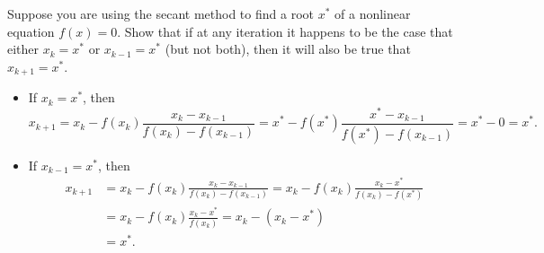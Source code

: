 \begin{pro}
  Suppose you are using the secant method to find a root $x^{*}$ of a
  nonlinear equation $f(x)=0$.
  Show that if at any iteration it happens to be the case that either
  $x_k=x^{*}$ or $x_{k-1}=x^{*}$
  (but not both),
  then it will also be true that $x_{k+1}=x^{*}$.
\end{pro}
\begin{sol}
  \begin{itemize}
  \item
    If $x_k=x^{*}$, then
    \begin{displaymath}
      x_{k+1} = x_k - f(x_k)\frac{x_k-x_{k-1}}{f(x_k)-f(x_{k-1})}
      = x^{*} - f(x^{*})\frac{x^{*}-x_{k-1}}{f(x^{*})-f(x_{k-1})}
      = x^{*} - 0 = x^{*}.
    \end{displaymath}

  \item
    If $x_{k-1}=x^{*}$, then
    \begin{align*}
      x_{k+1} &= x_k - f(x_k)\frac{x_k-x_{k-1}}{f(x_k)-f(x_{k-1})}
                = x_k - f(x_k)\frac{x_k - x^{*}}{f(x_k)-f(x^{*})} \\
      &= x_k - f(x_k) \frac{x_k-x^{*}}{f(x_k)} = x_k - (x_k - x^{*})
      \\
      &= x^{*}.
    \end{align*}
  \end{itemize}
\end{sol}
